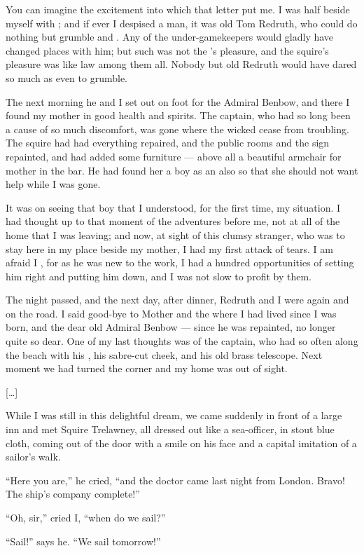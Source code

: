 \documentclass{fiche}
\begin{document}
\begin{texte}
You can imagine the excitement into which that letter put me. I was half beside myself with
; and if ever I despised a man, it was old Tom Redruth, who
could do nothing but grumble and . Any of the
under-gamekeepers would gladly have changed places with him; but such was not the
's pleasure, and the squire's pleasure was
like law among them all. Nobody but old Redruth would have dared so much as even to grumble.

The next morning he and I set out on foot for the Admiral Benbow, and there I found my mother
in good health and spirits. The captain, who had so long been a cause of so much discomfort,
was gone where the wicked cease from troubling. The squire had had everything repaired, and
the public rooms and the sign repainted, and had added some furniture --- above all a
beautiful armchair for mother in the bar. He had found her a boy as an
 also so that she should not want help while I was
gone.

It was on seeing that boy that I understood, for the first time, my situation. I had thought
up to that moment of the adventures before me, not at all of the home that I was leaving; and
now, at sight of this clumsy stranger, who was to stay here in my place beside my mother, I
had my first attack of tears. I am afraid I , for as he was new to the work, I had a hundred
opportunities of setting him right and putting him down, and I was not slow to profit by
them.

The night passed, and the next day, after dinner, Redruth and I were  again and on the road. I said good-bye to Mother and the
 where I had lived since I was born, and the dear old Admiral
Benbow --- since he was repainted, no longer quite so dear. One of my last thoughts was of
the captain, who had so often  along the
beach with his , his sabre-cut cheek, and his old
brass telescope. Next moment we had turned the corner and my home was out of sight.

[\ldots]

While I was still in this delightful dream, we came suddenly in front of a large inn and met
Squire Trelawney, all dressed out like a sea-officer, in stout blue cloth, coming out of the
door with a smile on his face and a capital imitation of a sailor's walk.

``Here you are,'' he cried, ``and the doctor came last night from London. Bravo! The ship's
company complete!''

``Oh, sir,'' cried I, ``when do we sail?''

``Sail!'' says he. ``We sail tomorrow!''
\end{texte}
\end{document}
